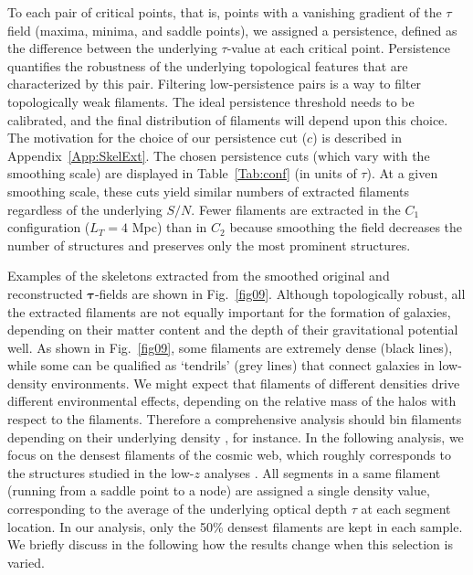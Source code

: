 \documentclass{aa}
\begin{document}
To each pair of critical points, that is, points with a vanishing gradient of the $\tau$ field (maxima, minima, and saddle points), we assigned a persistence, defined as the difference between the underlying $\tau$-value at each critical point. Persistence quantifies the robustness of the underlying topological features that are characterized by this pair.  Filtering low-persistence pairs is a way to filter topologically weak filaments. The ideal persistence threshold needs to be calibrated, and the final distribution of filaments will depend upon this choice. The motivation for the choice of our persistence cut ($c$) is described in Appendix~\ref{App:SkelExt}. The chosen persistence cuts (which vary with the smoothing scale) are displayed in Table~\ref{Tab:conf} (in units of $\tau$). At a given smoothing scale, these cuts yield similar numbers of extracted filaments regardless of the underlying $S/N$. Fewer filaments are extracted in the $C_1$ configuration ($L_{T}=4$ Mpc)  than in $C_2$ because smoothing the  field decreases the number of structures and preserves only the most prominent structures.  

Examples of the  skeletons extracted from the smoothed original and reconstructed $\mathbf{\tau}$-fields are shown in Fig.~\ref{fig09}. Although topologically robust, all the extracted filaments are not equally important for the formation of galaxies, depending on their matter content and the depth of their gravitational potential well. As shown in Fig.~\ref{fig09}, some filaments are extremely dense (black lines), while some can be qualified as `tendrils' (grey lines) that connect galaxies in low-density environments. We might expect that filaments of different densities drive different environmental effects, depending on the relative mass of the halos with respect to the filaments. Therefore a comprehensive analysis should bin filaments depending on their underlying density \citep[as done in e.g.][]{katz2019}, for instance. In the following analysis, we focus on the densest filaments of the cosmic web, which roughly corresponds to the structures studied in the low-$z$ analyses \citep[e.g.][]{Kraljic2018,Laigle2018}. All segments in a same filament (running from a saddle point to a node) are assigned a single density value, corresponding to the average of the underlying optical depth $\tau$ at each segment location. In our analysis, only the 50\% densest filaments are kept in each sample. We briefly discuss in the following how the results change when this selection is varied. 
\end{document}
